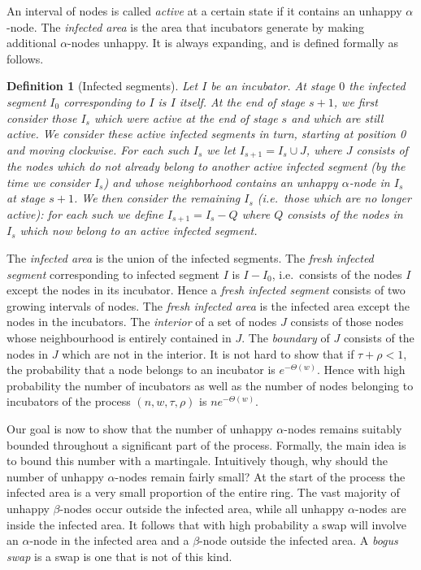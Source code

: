 \documentclass[11pt]{article}
\theoremstyle{plain}
\newtheorem{defi}[thm]{Definition}
\numberwithin{equation}{subsection}
\begin{document}
An interval of nodes is called {\em active} at a certain state if it contains 
an unhappy $\alpha$-node.
The {\em infected area} is the area that incubators generate by 
making additional $\alpha$-nodes unhappy. It is always expanding, and is defined formally as follows.

\begin{defi}[Infected segments]
Let $I$ be an incubator. 
At stage $0$ the infected segment $I_0$ corresponding to $I$ is
$I$ itself.
At the end of stage $s+1$, we first consider those $I_s$ which were active at the end of stage $s$ and which are still active. 
We consider these active infected segments in turn, starting at position 0 and moving clockwise.  For each such $I_s$   
we let $I_{s+1}=I_{s}\cup J$,
where $J$
consists of the nodes 
which do not already belong
to another active infected segment (by the time we consider $I_s$)  and
whose neighborhood contains an unhappy $\alpha$-node in 
$I_{s}$ at stage $s+1$. We then consider the remaining $I_s$ (i.e.\ those which are no longer active): 
for each such we  define $I_{s+1}=I_s-Q$ where $Q$ consists of the nodes in $I_s$
which now belong to an active infected segment.
\end{defi}

The {\em infected area} is the union of the infected segments.
The {\em fresh infected segment} corresponding to infected segment $I$
is $I-I_0$, i.e.\ consists of the nodes $I$ except the nodes in its incubator.
Hence a {\em fresh infected segment} consists of two growing intervals of nodes. 
The {\em fresh infected area} is the infected area except the nodes in the incubators.
The {\em interior} of a set of nodes $J$ consists of those nodes whose
neighbourhood is entirely contained in $J$.
The {\em boundary} of $J$ consists of the nodes in $J$ which are not in the interior. 
It is not hard to show that if $\tau+\rho<1$, the probability that a node belongs to an incubator is
$e^{-\Theta(w)}$. Hence with high probability  
 the number of incubators as well as the number of nodes belonging to incubators
 of the process $(n,w,\tau,\rho)$ is $n e^{-\Theta(w)}$.

Our goal is now to show that the number of unhappy 
$\alpha$-nodes remains suitably bounded throughout a significant part of the process. 
Formally, the main idea is to bound this number with a 
martingale. Intuitively though, why should the number of unhappy $\alpha$-nodes remain fairly small? 
At the start of the process the infected area is a very small proportion of the
entire ring. The vast majority of unhappy $\beta$-nodes occur outside
the infected area, while all unhappy $\alpha$-nodes are inside the infected area.
It follows that with high probability a 
swap will involve an $\alpha$-node in the infected
area and a $\beta$-node outside the infected area. A {\em bogus swap} is a swap is one that is not of this kind.
\end{document}
